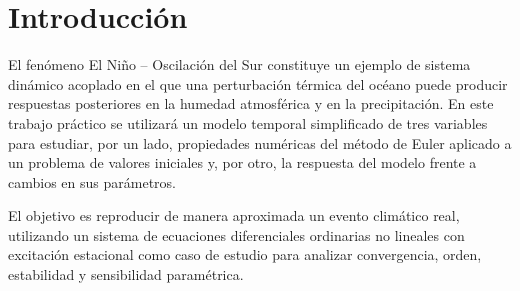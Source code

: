 \section{Introducción}

El fenómeno El Niño – Oscilación del Sur constituye un ejemplo de sistema dinámico acoplado en el que una perturbación térmica del océano puede producir respuestas posteriores en la humedad atmosférica y en la precipitación. En este trabajo práctico se utilizará un modelo temporal simplificado de tres variables para estudiar, por un lado, propiedades numéricas del método de Euler aplicado a un problema de valores iniciales y, por otro, la respuesta del modelo frente a cambios en sus parámetros.

El objetivo es reproducir de manera aproximada un evento climático real, utilizando un sistema de ecuaciones diferenciales ordinarias no lineales con excitación estacional como caso de estudio para analizar convergencia, orden, estabilidad y sensibilidad paramétrica. 

